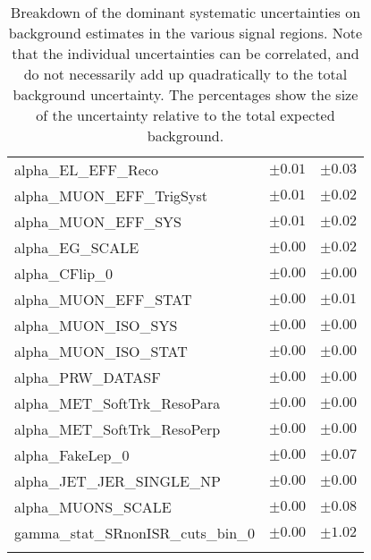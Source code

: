 \begin{table}
\begin{center}
\begin{tabular*}{\textwidth}{@{\extracolsep{\fill}}lcc}
alpha\_EL\_EFF\_Reco         & $\pm 0.01$          & $\pm 0.03$       \\
alpha\_MUON\_EFF\_TrigSyst         & $\pm 0.01$          & $\pm 0.02$       \\
alpha\_MUON\_EFF\_SYS         & $\pm 0.01$          & $\pm 0.02$       \\
alpha\_EG\_SCALE         & $\pm 0.00$          & $\pm 0.02$       \\
alpha\_CFlip\_0         & $\pm 0.00$          & $\pm 0.00$       \\
alpha\_MUON\_EFF\_STAT         & $\pm 0.00$          & $\pm 0.01$       \\
alpha\_MUON\_ISO\_SYS         & $\pm 0.00$          & $\pm 0.00$       \\
alpha\_MUON\_ISO\_STAT         & $\pm 0.00$          & $\pm 0.00$       \\
alpha\_PRW\_DATASF         & $\pm 0.00$          & $\pm 0.00$       \\
alpha\_MET\_SoftTrk\_ResoPara         & $\pm 0.00$          & $\pm 0.00$       \\
alpha\_MET\_SoftTrk\_ResoPerp         & $\pm 0.00$          & $\pm 0.00$       \\
alpha\_FakeLep\_0         & $\pm 0.00$          & $\pm 0.07$       \\
alpha\_JET\_JER\_SINGLE\_NP         & $\pm 0.00$          & $\pm 0.00$       \\
alpha\_MUONS\_SCALE         & $\pm 0.00$          & $\pm 0.08$       \\
gamma\_stat\_SRnonISR\_cuts\_bin\_0         & $\pm 0.00$          & $\pm 1.02$       \\
\noalign{\smallskip}\hline\noalign{\smallskip}
\end{tabular*}
\end{center}

\caption[Breakdown of uncertainty on background estimates]{
Breakdown of the dominant systematic uncertainties on background estimates in the various signal regions.
Note that the individual uncertainties can be correlated, and do not necessarily add up quadratically to
the total background uncertainty. The percentages show the size of the uncertainty relative to the total expected background.
\label{table.results.bkgestimate.uncertainties.SR}}
\end{table}
%
